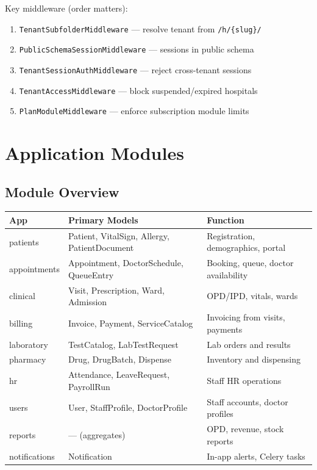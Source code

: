 \documentclass[11pt,a4paper]{report}
\begin{document}
Key middleware (order matters):
\begin{enumerate}[noitemsep]
    \item \texttt{TenantSubfolderMiddleware} --- resolve tenant from \texttt{/h/\{slug\}/}
    \item \texttt{PublicSchemaSessionMiddleware} --- sessions in public schema
    \item \texttt{TenantSessionAuthMiddleware} --- reject cross-tenant sessions
    \item \texttt{TenantAccessMiddleware} --- block suspended/expired hospitals
    \item \texttt{PlanModuleMiddleware} --- enforce subscription module limits
\end{enumerate}

\chapter{Application Modules}

\section{Module Overview}

\begin{longtable}{@{}p{3cm}p{4.5cm}p{6cm}@{}}
\toprule
\textbf{App} & \textbf{Primary Models} & \textbf{Function} \\
\midrule
\endhead
patients & Patient, VitalSign, Allergy, PatientDocument & Registration, demographics, portal \\
appointments & Appointment, DoctorSchedule, QueueEntry & Booking, queue, doctor availability \\
clinical & Visit, Prescription, Ward, Admission & OPD/IPD, vitals, wards \\
billing & Invoice, Payment, ServiceCatalog & Invoicing from visits, payments \\
laboratory & TestCatalog, LabTestRequest & Lab orders and results \\
pharmacy & Drug, DrugBatch, Dispense & Inventory and dispensing \\
hr & Attendance, LeaveRequest, PayrollRun & Staff HR operations \\
users & User, StaffProfile, DoctorProfile & Staff accounts, doctor profiles \\
reports & --- (aggregates) & OPD, revenue, stock reports \\
notifications & Notification & In-app alerts, Celery tasks \\
\bottomrule
\end{longtable}
\end{document}
